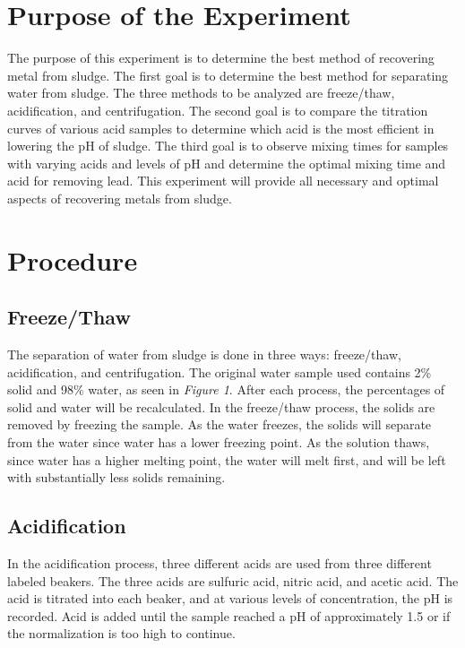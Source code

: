 \documentclass{article}
\begin{document}
    
    \tableofcontents
    \newpage
    \listoftables
    \listoffigures
    \newpage
    \section{Purpose of the Experiment}
    The purpose of this experiment is to determine the best method of recovering metal from sludge. The first goal is to determine the best method for separating water from sludge. The three methods to be analyzed are freeze/thaw, acidification, and centrifugation. The second goal is to compare the titration curves of various acid samples to determine which acid is the most efficient in lowering the pH of sludge. The third goal is to observe mixing times for samples with varying acids and levels of pH and determine the optimal mixing time and acid for removing lead. This experiment will provide all necessary and optimal aspects of recovering metals from sludge.
    \newpage
    \section{Procedure}
    \subsection{Freeze/Thaw}
    The separation of water from sludge is done in three ways: freeze/thaw, acidification, and centrifugation. The original water sample used contains 2\% solid and 98\% water, as seen in \textit{Figure 1}. After each process, the percentages of solid and water will be recalculated. In the freeze/thaw process, the solids are removed by freezing the sample. As the water freezes, the solids will separate from the water since water has a lower freezing point. As the solution thaws, since water has a higher melting point, the water will melt first, and will be left with substantially less solids remaining.
    \subsection{Acidification}
    In the acidification process, three different acids are used from three different labeled beakers. The three acids are sulfuric acid, nitric acid, and acetic acid. The acid is titrated into each beaker, and at various levels of concentration, the pH is recorded. Acid is added until the sample reached a pH of approximately 1.5 or if the normalization is too high to continue.
\end{document}
